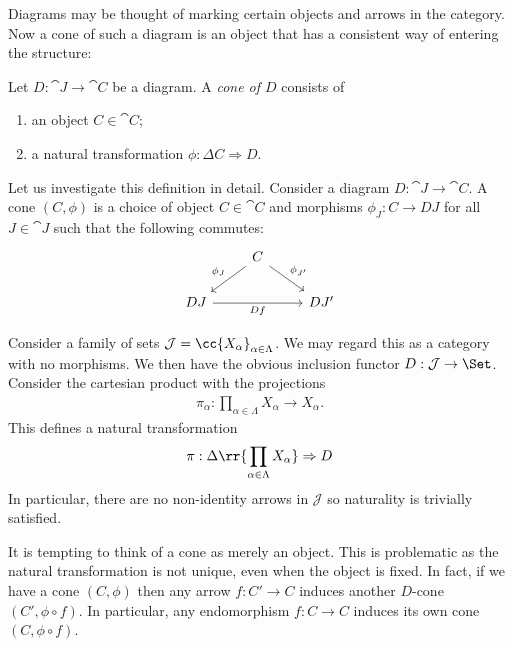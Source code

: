 \documentclass{article}
\begin{document}
Diagrams may be thought of marking certain objects and arrows in the category.
Now a cone of such a diagram is an object that has a consistent way of entering
the structure:

\begin{definition}
  Let $D:\cat{J}\to\cat{C}$ be a diagram. A \emph{cone of $D$} consists of
  \begin{enumerate}
    \item an object $C\in\cat{C}$;
    \item a natural transformation $\phi:\Delta C\Rightarrow D$.
  \end{enumerate}
\end{definition}

Let us investigate this definition in detail. Consider a diagram
$D:\cat{J}\to\cat{C}$. A cone $(C,\phi)$ is a choice of object $C\in\cat{C}$
and morphisms $\phi_J:C\to DJ$ for all $J\in\cat{J}$ such that the following
commutes:
\begin{equation}
  \begin{tikzcd}
  & C \\
    DJ && {DJ'}
    \arrow["Df"', from=2-1, to=2-3]
    \arrow["{\phi_{J'}}", from=1-2, to=2-3]
    \arrow["{\phi_J}"', from=1-2, to=2-1]
  \end{tikzcd}
\end{equation}

\begin{example}
  Consider a family of sets $\mathcal J=\cc{X_\alpha}_{\alpha\in\Lambda}$. We may
  regard this as a category with no morphisms. We then have
  the obvious inclusion functor $D:\mathcal J\to\Set$. Consider the cartesian
  product with the projections
  \begin{align*}
    \pi_\alpha : \prod_{\alpha\in\Lambda} X_\alpha \to X_\alpha.
  \end{align*}
  This defines a natural transformation
  \begin{align*}
    \pi : \Delta\rr{\prod_{\alpha\in\Lambda} X_\alpha}\Rightarrow D
  \end{align*}
  In particular, there are no non-identity arrows in $\mathcal J$ so
  naturality is trivially satisfied.
\end{example}

It is tempting to think of a cone as merely an object. This is problematic as
the natural transformation is not unique, even when the object is fixed. In
fact, if we have a cone $(C,\phi)$ then any arrow $f:C'\to C$ induces another
$D$-cone $(C',\phi\circ f)$. In particular, any endomorphism $f:C\to C$ induces
its own cone $(C,\phi\circ f)$.
\end{document}
